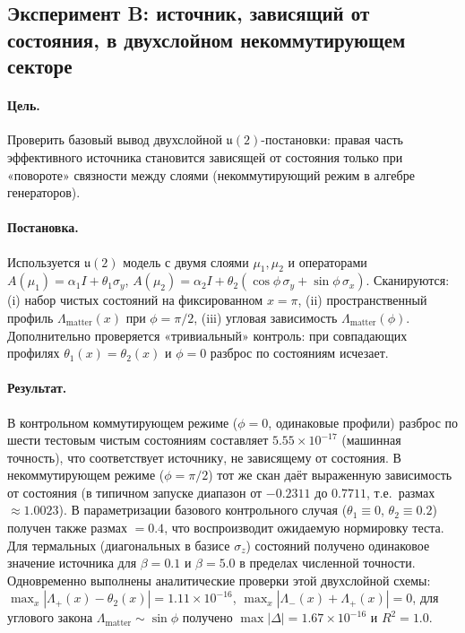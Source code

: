 \documentclass[11pt,a4paper]{article}
\theoremstyle{definition}
\theoremstyle{plain}
\theoremstyle{remark}
\begin{document}
\subsection{Эксперимент B: источник, зависящий от состояния, в двухслойном некоммутирующем секторе}
\label{sec:numerics:B}

\paragraph{Цель.}
Проверить базовый вывод двухслойной $\mathfrak u(2)$-постановки:
правая часть эффективного источника становится зависящей от состояния
только при «повороте» связности между слоями (некоммутирующий режим в алгебре генераторов).

\paragraph{Постановка.}
Используется $\mathfrak u(2)$ модель с двумя слоями $\mu_1,\mu_2$ и операторами
$A(\mu_1)=\alpha_1 I+\theta_1\sigma_y$, $A(\mu_2)=\alpha_2 I+\theta_2(\cos\phi\,\sigma_y+\sin\phi\,\sigma_x)$.
Сканируются:
(i) набор чистых состояний на фиксированном $x=\pi$,
(ii) пространственный профиль $\Lambda_{\mathrm{matter}}(x)$ при $\phi=\pi/2$,
(iii) угловая зависимость $\Lambda_{\mathrm{matter}}(\phi)$.
Дополнительно проверяется «тривиальный» контроль: при совпадающих профилях $\theta_1(x)=\theta_2(x)$ и $\phi=0$
разброс по состояниям исчезает.

\paragraph{Результат.}
В контрольном коммутирующем режиме ($\phi=0$, одинаковые профили) разброс по шести тестовым чистым состояниям
составляет $5.55\times 10^{-17}$ (машинная точность), что соответствует источнику, не зависящему от состояния.
В некоммутирующем режиме ($\phi=\pi/2$) тот же скан даёт выраженную зависимость от состояния
(в типичном запуске диапазон от $-0.2311$ до $0.7711$, т.е.\ размах $\approx 1.0023$).
В параметризации базового контрольного случая
($\theta_1\equiv 0$, $\theta_2\equiv 0.2$) получен также размах $=0.4$,
что воспроизводит ожидаемую нормировку теста.
Для термальных (диагональных в базисе $\sigma_z$) состояний получено одинаковое значение источника
для $\beta=0.1$ и $\beta=5.0$ в пределах численной точности.
Одновременно выполнены аналитические проверки этой двухслойной схемы:
$\max_x|\Lambda_{+}(x)-\theta_2(x)|=1.11\times 10^{-16}$,
$\max_x|\Lambda_{-}(x)+\Lambda_{+}(x)|=0$,
для углового закона $\Lambda_{\mathrm{matter}}\sim\sin\phi$ получено
$\max|\Delta|=1.67\times 10^{-16}$ и $R^2=1.0$.
\end{document}
